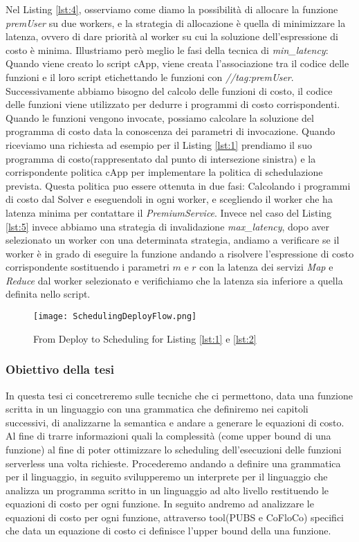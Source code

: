 \documentclass[../main.tex]{subfiles}
\begin{document}
Nel Listing \ref{lst:4}, osserviamo come diamo la possibilità di allocare la funzione \textit{premUser} su due workers, e la strategia di allocazione è quella di minimizzare la latenza, ovvero di dare priorità al worker su cui la soluzione dell'espressione di costo è minima.
Illustriamo però meglio le fasi della tecnica di \textit{min\_latency}:
Quando viene creato lo script cApp, viene creata l'associazione tra il codice delle funzioni e il loro script etichettando le funzioni con \textit{//tag:premUser}.
Successivamente abbiamo bisogno del calcolo delle funzioni di costo, il codice delle funzioni viene utilizzato per dedurre i programmi di costo corrispondenti.
Quando le funzioni vengono invocate, possiamo calcolare la soluzione del programma di costo data la conoscenza dei parametri di invocazione.
Quando riceviamo una richiesta ad esempio per il Listing \ref{lst:1} prendiamo il suo programma di costo(rappresentato dal punto di intersezione sinistra) e la corrispondente politica cApp per implementare la politica di schedulazione prevista.
Questa politica puo essere ottenuta in due fasi: Calcolando i programmi di costo dal Solver e eseguendoli in ogni worker, e scegliendo il worker che ha latenza minima per contattare il \textit{PremiumService}.
Invece nel caso del Listing \ref{lst:5} invece abbiamo una strategia di invalidazione \textit{max\_latency}, dopo aver selezionato un worker con una determinata strategia, andiamo a verificare se il worker è in grado di eseguire la funzione andando a risolvere l'espressione di costo corrispondente sostituendo i parametri $m$ e $r$ con la latenza dei servizi \textit{Map} e \textit{Reduce} dal worker selezionato e verifichiamo che la latenza sia inferiore a quella definita nello script.\autocite{deserverless}\\
\begin{figure}[H]
    \texttt{[image: SchedulingDeployFlow.png]}
    \centering
    \caption{From Deploy to Scheduling for Listing \ref{lst:1} e \ref{lst:2} }
\end{figure}
\newpage
\subsubsection{Obiettivo della tesi}

In questa tesi ci concetreremo sulle tecniche che ci permettono, data una funzione scritta in un linguaggio con una grammatica che definiremo nei capitoli successivi, di analizzarne la semantica e andare a generare le equazioni di costo.
Al fine di trarre informazioni quali la complessità (come upper bound di una funzione) al fine di poter ottimizzare lo scheduling dell'esecuzioni delle funzioni serverless una volta richieste.
Procederemo andando a definire una grammatica per il linguaggio, in seguito svilupperemo un interprete per il linguaggio che analizza un programma scritto in un linguaggio ad alto livello restituendo le equazioni di costo per ogni funzione.
In seguito andremo ad analizzare le equazioni di costo per ogni funzione, attraverso tool(PUBS \autocite{albert2008automatic} e CoFloCo\autocite{flores2014resource}) specifici che data un equazione di costo ci definisce l'upper bound della una funzione.
\end{document}
